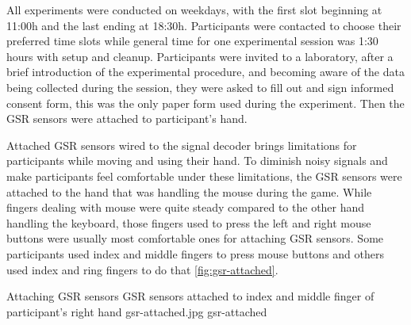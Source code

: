 All experiments were conducted on weekdays, with the first slot beginning at 11:00h and the last ending at 18:30h. Participants were contacted to choose their preferred time slots while general time for one experimental session was 1:30 hours with setup and cleanup. Participants were invited to a laboratory, after a brief introduction of the experimental procedure, and becoming aware of the data being collected during the session, they were asked to fill out and sign informed consent form, this was the only paper form used during the experiment. Then the GSR sensors were attached to participant's hand.


Attached GSR sensors wired to the signal decoder brings limitations for participants while moving and using their hand. To diminish noisy signals and make participants feel comfortable under these limitations, the GSR sensors were attached to the hand that was handling the mouse during the game. While fingers dealing with mouse were quite steady compared to the other hand handling the keyboard, those fingers used to press the left and right mouse buttons were usually most comfortable ones for attaching GSR sensors. Some participants used index and middle fingers to press mouse buttons and others used index and ring fingers to do that \ref{fig:gsr-attached}.

\img
{Attaching GSR sensors}
{GSR sensors attached to index and middle finger of participant's right hand}
{gsr-attached.jpg}
{gsr-attached}

